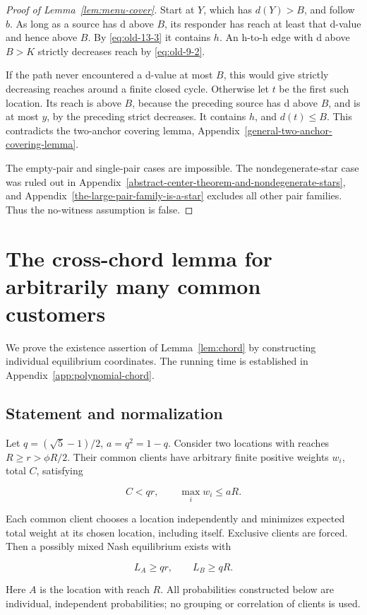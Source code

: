 \documentclass[11pt]{amsart}
\numberwithin{equation}{section}
\theoremstyle{definition}
\begin{document}
\begin{proof}[Proof of Lemma~\ref{lem:menu-cover}]
Start at \(Y\), which has \(d(Y)>B\), and follow \(b\). As long as a source has d above \(B\), its responder has reach at least that d-value and hence above \(B\). By \eqref{eq:old-13-3} it contains \(h\). An h-to-h edge with d above \(B>K\) strictly decreases reach by \eqref{eq:old-9-2}.

If the path never encountered a d-value at most \(B\), this would give strictly decreasing reaches around a finite closed cycle. Otherwise let \(t\) be the first such location. Its reach is above \(B\), because the preceding source has d above \(B\), and is at most \(y\), by the preceding strict decreases. It contains \(h\), and \(d(t)\le B\). This contradicts the two-anchor covering lemma, Appendix~\ref{general-two-anchor-covering-lemma}.

The empty-pair and single-pair cases are impossible. The nondegenerate-star case was ruled out in Appendix~\ref{abstract-center-theorem-and-nondegenerate-stars}, and Appendix~\ref{the-large-pair-family-is-a-star} excludes all other pair families. Thus the no-witness assumption is false.
\end{proof}


\section{The cross-chord lemma for arbitrarily many common customers}
\label{app:cross-chord}
We prove the existence assertion of Lemma~\ref{lem:chord} by constructing individual equilibrium coordinates. The running time is established in Appendix~\ref{app:polynomial-chord}.
\subsection{Statement and normalization}

Let \(q=(\sqrt5-1)/2\), \(a=q^2=1-q\). Consider two locations with reaches \(R\ge r>\phi R/2\). Their common clients have arbitrary finite positive weights \(w_i\), total \(C\), satisfying

\[
C<qr,\qquad \max_i w_i\le aR.
\]

Each common client chooses a location independently and minimizes expected total weight at its chosen location, including itself. Exclusive clients are forced. Then a possibly mixed Nash equilibrium exists with

\[
L_A\ge qr,\qquad L_B\ge qR.
\]

Here \(A\) is the location with reach \(R\). All probabilities constructed below are individual, independent probabilities; no grouping or correlation of clients is used.
\end{document}
